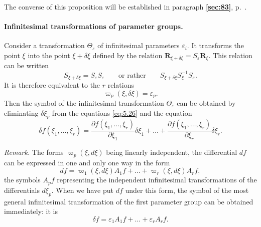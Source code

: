 \documentclass[leqno,11pt]{book}
\makeatletter
\numberwithin{equation}{chapter}
\newcommand{\pd}{\partial}
\theoremstyle{shape1}
\theoremstyle{shapesmall}
\let\old@epsilon\epsilon
\let\old@varepsilon\varepsilon
\let\epsilon\old@varepsilon
\let\varepsilon\old@epsilon
\newcommand{\fsref}[1]{{\rm\textsection\textbf{\ref{sec:#1}}}}
\newcommand{\vp}{\varpi}
\newcommand{\somespace}{\vspace{9pt}}
\makeatother
\begin{document}
The converse of this proposition will be established in paragraph \fsref{83}, p.~\pageref{sec:83}.

\paragraph{Infinitesimal transformations of parameter groups.}
\label{sec:81}
Consider a transformation $\Theta_{\epsilon}$ of infinitesimal parameters $\epsilon_{i}$. It transforms the point $\xi$ into the point $\xi+\delta\xi$ defined by the relation $\mathbf{R}_{\xi+\delta\xi}=S_{\epsilon}\mathbf{R}_{\xi}$. This relation can be written
\[
S_{\xi+\delta\xi}=S_{\epsilon}S_{\epsilon}\qquad\text{or rather}\qquad S_{\xi+\delta\xi}S_{\xi}^{-1}S_{\epsilon}.
\]
It is therefore equivalent to the $r$ relations
\begin{equation}
  \label{eq:5.26}
  \vp_{p}(\xi,\delta\xi)=\epsilon_{p}.
\end{equation}
Then the symbol of the infinitesimal transformation $\Theta_{\epsilon}$ can be obtained by eliminating $\delta\xi_{p}$ from the equations \eqref{eq:5.26} and the equation
\[
\delta f(\xi_{1},\dots,\xi_{r})=\frac{\pd f(\xi_{1},\dots,\xi_{r})}{\pd\xi_{1}}\delta\xi_{1}+\dots+\frac{\pd f(\xi_{1},\dots,\xi_{r})}{\pd \xi_{r}}\delta\xi_{r}.
\]
\somespace

\emph{Remark.} The forms $\vp_{p}(\xi,d\xi)$ being linearly independent, the differential $df$ can be expressed in one and only one way in the form
\begin{equation}
  \label{eq:5.27}
  df=\vp_{1}(\xi,d\xi)A_{1}f+\dots+\vp_{r}(\xi,d\xi)A_{r}f,
\end{equation}
the symbols $A_{p}f$ representing the independent infinitesimal transformations of the differentials $d\xi_{p}$. When we have put $df$ under this form, the symbol of the most general infinitesimal transformation of the first parameter group can be obtained immediately: it is
\begin{equation}
  \label{eq:5.28}
  \delta f=\epsilon_{1}A_{1}f+\dots+\epsilon_{r}A_{r}f.
\end{equation}

\somespace
\end{document}
